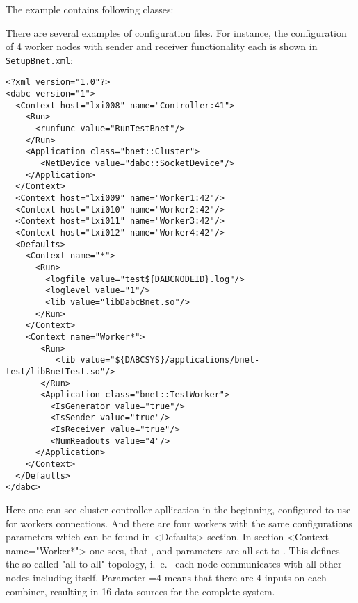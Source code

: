 The example contains following classes:
\bbul
\item  {}
\item  {}
\item  {}
\item  {}
\item  {}
\item  {}
\ebul

There are several examples of configuration files. For instance,
the configuration of 4 worker nodes with sender and receiver functionality each
is shown in {\tt SetupBnet.xml}:

\begin{small}
\begin{verbatim}
<?xml version="1.0"?>
<dabc version="1">
  <Context host="lxi008" name="Controller:41">
    <Run>
      <runfunc value="RunTestBnet"/>
    </Run>
    <Application class="bnet::Cluster">
       <NetDevice value="dabc::SocketDevice"/>
    </Application>
  </Context>
  <Context host="lxi009" name="Worker1:42"/>
  <Context host="lxi010" name="Worker2:42"/>
  <Context host="lxi011" name="Worker3:42"/>
  <Context host="lxi012" name="Worker4:42"/>
  <Defaults>
    <Context name="*">
      <Run>
        <logfile value="test${DABCNODEID}.log"/>
        <loglevel value="1"/>
        <lib value="libDabcBnet.so"/>
      </Run>
    </Context>
    <Context name="Worker*">
       <Run>
          <lib value="${DABCSYS}/applications/bnet-test/libBnetTest.so"/>
       </Run>
       <Application class="bnet::TestWorker">
         <IsGenerator value="true"/>
         <IsSender value="true"/>
         <IsReceiver value="true"/>
         <NumReadouts value="4"/>
      </Application>       
    </Context>
  </Defaults>
</dabc>
\end{verbatim}
\end{small}

Here one can see cluster controller apllication in the beginning, configured to
use  for workers connections. And there are four workers
with the same configurations parameters which can be found in <Defaults> section.
In section <Context name="Worker*"> one sees, 
that ,  and  parameters are 
all set to .
This defines the so-called "all-to-all" topology, i.~e.~ each node communicates with all other nodes including itself.   
Parameter =4 means that there are 4 inputs on each combiner, 
resulting  in 16 data sources for the complete system.


